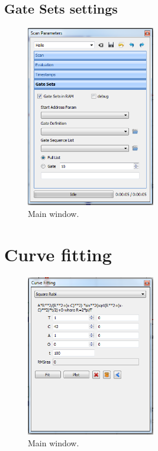 \documentclass[11pt]{scrartcl}
\begin{document}
\subsection{Gate Sets settings}
\begin{figure}[htbp]
\begin{center}
\includegraphics[width=0.5\textwidth]{ScanParametersGateSets}
\end{center}
\caption{\label{PulseProgram} Main window.}
\end{figure}

\section{Curve fitting}
\begin{figure}[htbp]
\begin{center}
\includegraphics[width=0.5\textwidth]{CurveFitting}
\end{center}
\caption{\label{AutoloadSettings} Main window.}
\end{figure}
\end{document}
